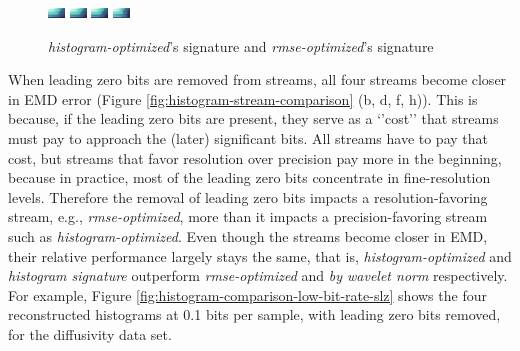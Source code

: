 \begin{figure}
	\centering
	{\includegraphics[width=0.24\linewidth]{img/histogram/sig-GREEDY-(histogram-128).png}}
	{\includegraphics[width=0.24\linewidth]{img/histogram/sig-GREEDY-(histogram-256).png}}
	{\includegraphics[width=0.24\linewidth]{img/histogram/sig-GREEDY-(histogram-512).png}}
	{\includegraphics[width=0.24\linewidth]{img/histogram/sig-GREEDY-(rmse).png}}
	\caption{\emph{histogram-optimized}'s signature and \emph{rmse-optimized}'s signature}
	\label{fig:histogram-signature-comparison}
\end{figure}

When leading zero bits are removed from streams, all four streams become closer in EMD error (Figure
\ref{fig:histogram-stream-comparison} (b, d, f, h)). This is because, if the leading zero bits are
present, they serve as a `'cost'' that streams must pay to approach the (later) significant bits.
All streams have to pay that cost, but streams that favor resolution over precision pay more in the
beginning, because in practice, most of the leading zero bits concentrate in fine-resolution levels.
Therefore the removal of leading zero bits impacts a resolution-favoring stream, e.g.,
\emph{rmse-optimized}, more than it impacts a precision-favoring stream such as
\emph{histogram-optimized}. Even though the streams become closer in EMD, their relative performance
largely stays the same, that is, \emph{histogram-optimized} and \emph{histogram signature}
outperform \emph{rmse-optimized} and \emph{by wavelet norm} respectively. For example, Figure
\ref{fig:histogram-comparison-low-bit-rate-slz} shows the four reconstructed histograms at 0.1 bits
per sample, with leading zero bits removed, for the diffusivity data set.

